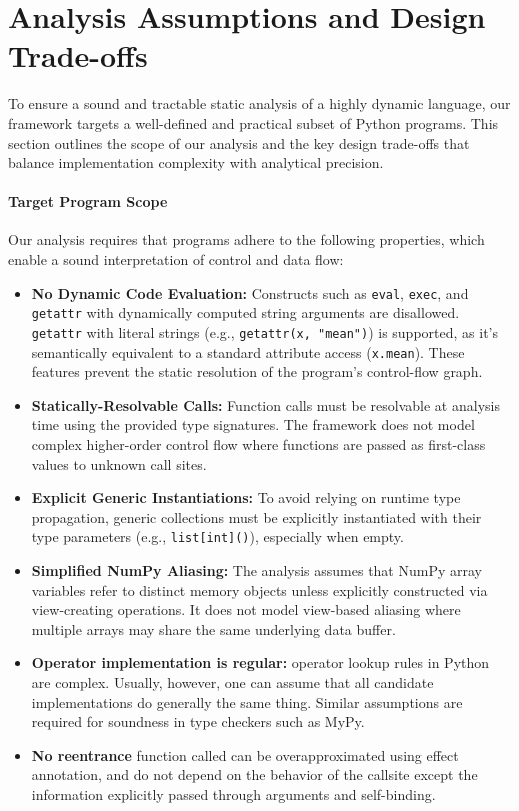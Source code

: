 \clearpage
\appendix
\section{Analysis Assumptions and Design Trade-offs}
\label{sec:appendix-assumptions}

To ensure a sound and tractable static analysis of a highly dynamic language, our framework targets a well-defined and practical subset of Python programs. This section outlines the scope of our analysis and the key design trade-offs that balance implementation complexity with analytical precision.

\paragraph{Target Program Scope}
Our analysis requires that programs adhere to the following properties, which enable a sound interpretation of control and data flow:
\begin{itemize}
    \item \textbf{No Dynamic Code Evaluation:} Constructs such as \texttt{eval}, \texttt{exec}, and \texttt{getattr} with dynamically computed string arguments are disallowed. \texttt{getattr} with literal strings (e.g., \texttt{getattr(x, "mean")}) is supported, as it's semantically equivalent to a standard attribute access (\texttt{x.mean}). These features prevent the static resolution of the program's control-flow graph.
    \item \textbf{Statically-Resolvable Calls:} Function calls must be resolvable at analysis time using the provided type signatures. The framework does not model complex higher-order control flow where functions are passed as first-class values to unknown call sites.
    \item \textbf{Explicit Generic Instantiations:} To avoid relying on runtime type propagation, generic collections must be explicitly instantiated with their type parameters (e.g., \texttt{list[int]()}), especially when empty.
    \item \textbf{Simplified NumPy Aliasing:} The analysis assumes that NumPy array variables refer to distinct memory objects unless explicitly constructed via view-creating operations. It does not model view-based aliasing where multiple arrays may share the same underlying data buffer.
    \item \textbf{Operator implementation is regular:} operator lookup rules in Python are complex. Usually, however, one can assume that all candidate implementations do generally the same thing. Similar assumptions are required for soundness in type checkers such as MyPy.
    \item \textbf{No reentrance} function called can be overapproximated using effect annotation, and do not depend on the behavior of the callsite except the information explicitly passed through arguments and self-binding.
\end{itemize}

